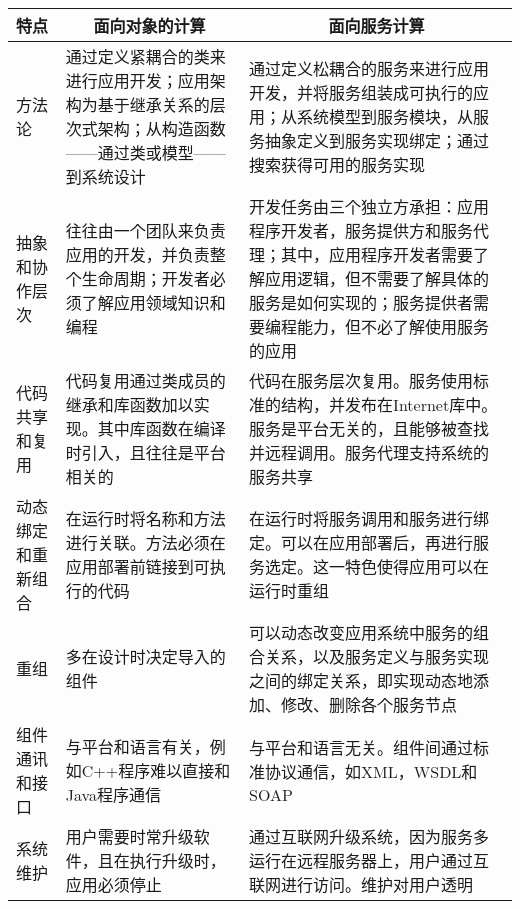 \vspace{-0.5em}
\begin{spacing}{1.2}
    \centering
    \begin{longtable}{|m{1.8cm}<{\centering}|m{6.5cm}|m{6.5cm}|}
		\hline
    \textbf{特点} & \multicolumn{1}{c|}{\textbf{面向对象的计算}}                   & \multicolumn{1}{c|}{\textbf{面向服务计算}}                                                          \\ \hline
    方法论         & 通过定义紧耦合的类来进行应用开发；应用架构为基于继承关系的层次式架构；从构造函数——通过类或模型——到系统设计 & 通过定义松耦合的服务来进行应用开发，并将服务组装成可执行的应用；从系统模型到服务模块，从服务抽象定义到服务实现绑定；通过搜索获得可用的服务实现                       \\ \hline
    抽象和协作层次     & 往往由一个团队来负责应用的开发，并负责整个生命周期；开发者必须了解应用领域知识和编程              & 开发任务由三个独立方承担：应用程序开发者，服务提供方和服务代理；其中，应用程序开发者需要了解应用逻辑，但不需要了解具体的服务是如何实现的；服务提供者需要编程能力，但不必了解使用服务的应用 \\ \hline
    代码共享和复用     & 代码复用通过类成员的继承和库函数加以实现。其中库函数在编译时引入，且往往是平台相关的              & 代码在服务层次复用。服务使用标准的结构，并发布在Internet库中。服务是平台无关的，且能够被查找并远程调用。服务代理支持系统的服务共享                         \\ \hline
    动态绑定和重新组合   & 在运行时将名称和方法进行关联。方法必须在应用部署前链接到可执行的代码                      & 在运行时将服务调用和服务进行绑定。可以在应用部署后，再进行服务选定。这一特色使得应用可以在运行时重组                                            \\ \hline
    重组          & 多在设计时决定导入的组件                                            & 可以动态改变应用系统中服务的组合关系，以及服务定义与服务实现之间的绑定关系，即实现动态地添加、修改、删除各个服务节点                                    \\ \hline
    组件通讯和接口     & 与平台和语言有关，例如C++程序难以直接和Java程序通信                           & 与平台和语言无关。组件间通过标准协议通信，如XML，WSDL和SOAP                                                           \\ \hline
    系统维护        & 用户需要时常升级软件，且在执行升级时，应用必须停止                               & 通过互联网升级系统，因为服务多运行在远程服务器上，用户通过互联网进行访问。维护对用户透明                                                  \\ \hline

\end{longtable}
\end{spacing}

